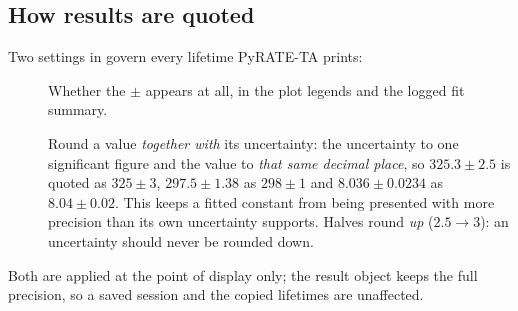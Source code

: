 \subsection{How results are quoted}

Two settings in \code{[plots]} govern every lifetime PyRATE-TA prints:

\begin{description}
  \item[] Whether the $\pm$ appears at all, in the
    plot legends and the logged fit summary.
  \item[] Round a value \emph{together with} its
    uncertainty: the uncertainty to one significant figure and the value to
    \emph{that same decimal place}, so $325.3 \pm 2.5$ is quoted as
    $325 \pm 3$, $297.5 \pm 1.38$ as $298 \pm 1$ and $8.036 \pm 0.0234$ as
    $8.04 \pm 0.02$. This keeps a fitted constant from being presented with
    more precision than its own uncertainty supports. Halves round \emph{up}
    ($2.5 \rightarrow 3$): an uncertainty should never be rounded down.
\end{description}

Both are applied at the point of display only; the result object keeps the full
precision, so a saved session and the copied lifetimes are unaffected.
